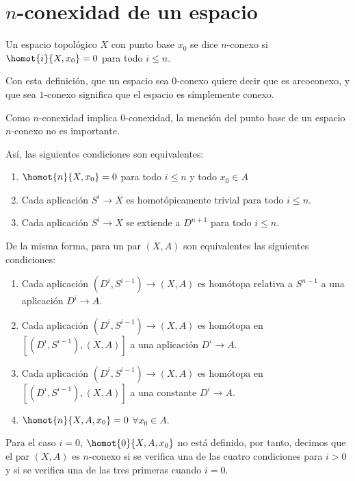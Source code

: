 \section{$n$-conexidad de un espacio}
\begin{defin}
Un espacio topológico $X$ con punto base $x_0$ se dice $n$-conexo si $\homot{i}{X, x_0} = 0$ para todo $i \leq n$.
\end{defin}
Con esta definición, que un espacio sea $0$-conexo quiere decir que es arcoconexo, y que sea $1$-conexo significa que el espacio es símplemente conexo. \par
Como $n$-conexidad implica $0$-conexidad, la mención del punto base de un espacio $n$-conexo no es importante. \par
Así, las siguientes condiciones son equivalentes:
\begin{enumerate}
\item $\homot{n}{X, x_0} = 0$ para todo $i \leq n$ y todo $x_0 \in A$
\item Cada aplicación $S^i \longrightarrow X$ es homotópicamente trivial para todo $i \leq n$.
\item Cada aplicación $S^i \longrightarrow X$ se extiende a $D^{n+1}$ para todo $i \leq n$.
\end{enumerate}
De la misma forma, para un par $(X, A)$ son equivalentes las siguientes condiciones:
\begin{enumerate}
\item Cada aplicación $(D^i, S^{i-1}) \longrightarrow (X, A)$ es homótopa relativa a $S^{n-1}$ a una aplicación $D^i \longrightarrow A$.
\item Cada aplicación $(D^i, S^{i-1}) \longrightarrow (X, A)$ es homótopa en $[(D^i, S^{i-1}), (X, A)]$ a una aplicación $D^i \longrightarrow A$.
\item Cada aplicación $(D^i, S^{i-1}) \longrightarrow (X, A)$ es homótopa en $[(D^i, S^{i-1}), (X, A)]$ a una constante $D^i \longrightarrow A$.
\item $\homot{n}{X, A, x_0} = 0$ $\forall x_0 \in A$.
\end{enumerate}
Para el caso $i = 0$, $\homot{0}{X, A, x_0}$ no está definido, por tanto, decimos que el par $(X, A)$ es $n$-conexo si se verifica una de las cuatro condiciones para $i > 0$ y si se verifica una de las tres primeras cuando $i=0$.

